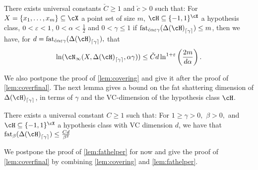 \begin{lemma}\label{lem:covering}
    There exists universal constants  $ \check{C}\geq 1$ and $\check{c}>0 $ such that: For $ X =\{  x_{1},\ldots,x_{m}\} \subseteq \cX$ a point set of size $ m $, $ \cH \subseteq \{-1,1\}^{\cX}$ a hypothesis class,  $ 0<\varepsilon<1 $, $ 0<\alpha<\frac{1}{2} $  and $ 0<\gamma\leq 1 $ if $\fat_{\check{c} \alpha\eps  \gamma}(\dlh_{\left\lceil\gamma\right\rceil})\leq m $, then we have, for $ d= \fat_{\check{c} \alpha\eps  \gamma}(\dlh_{\left\lceil\gamma\right\rceil}),$   that 
    \begin{align}
        \ln(\cN_{\infty}(X,\dlh_{\left\lceil\gamma\right\rceil} ,\alpha \gamma)) \leq\check{C} 
        d 
        \ln^{1+\eps}\left(\frac{2m}{d  \alpha}\right).
    \end{align}   
\end{lemma}
We also postpone the proof of \cref{lem:covering} and give it after the proof of \cref{lem:coverfinal}. The next lemma gives a bound on the fat shattering dimension of $ \dlh_{\left\lceil\gamma \right\rceil} $, in terms of $ \gamma $ and the VC-dimension of the hypothesis class $ \cH $. 

\begin{lemma}\label{lem:fathelper}
    There exists a universal constant $ C\geq 1 $ such that: For $1\geq \gamma >0  ,$ $ \beta>0,$ and $ \cH \subseteq \{-1,1\}^{\cX}$ a hypothesis class with VC dimension $ d $, we have that  $\fat_{\beta} (\dlh_{\left\lceil\gamma\right\rceil})\leq \frac{Cd}{\beta^{2}} $ 
\end{lemma}
We postpone the proof of \cref{lem:fathelper} for now and give the proof of \cref{lem:coverfinal} by combining \cref{lem:covering} and \cref{lem:fathelper}.

